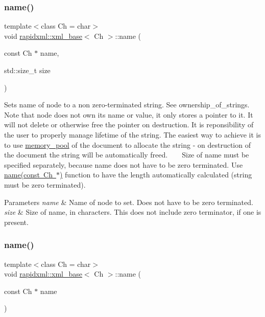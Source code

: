 \subsubsection{\texorpdfstring{name()}{name()}\hspace{0.1cm}{\footnotesize\ttfamily [2/3]}}
{\footnotesize\ttfamily template$<$class Ch  = char$>$ \\
void \mbox{\hyperlink{classrapidxml_1_1xml__base}{rapidxml\+::xml\+\_\+base}}$<$ Ch $>$\+::name (\begin{DoxyParamCaption}\item[{const Ch $\ast$}]{name,  }\item[{std\+::size\+\_\+t}]{size }\end{DoxyParamCaption})\hspace{0.3cm}{\ttfamily [inline]}}

Sets name of node to a non zero-\/terminated string. See ownership\+\_\+of\+\_\+strings. ~\newline
~\newline
 Note that node does not own its name or value, it only stores a pointer to it. It will not delete or otherwise free the pointer on destruction. It is reponsibility of the user to properly manage lifetime of the string. The easiest way to achieve it is to use \mbox{\hyperlink{classrapidxml_1_1memory__pool}{memory\+\_\+pool}} of the document to allocate the string -\/ on destruction of the document the string will be automatically freed. ~\newline
~\newline
 Size of name must be specified separately, because name does not have to be zero terminated. Use \mbox{\hyperlink{classrapidxml_1_1xml__base_a4611ddc82ac83a527c65606600eb2a0d}{name(const Ch $\ast$)}} function to have the length automatically calculated (string must be zero terminated). 
\begin{DoxyParams}{Parameters}
{\em name} & Name of node to set. Does not have to be zero terminated. \\
\hline
{\em size} & Size of name, in characters. This does not include zero terminator, if one is present. \\
\hline
\end{DoxyParams}
\mbox{\label{classrapidxml_1_1xml__base_a4611ddc82ac83a527c65606600eb2a0d}} 
\subsubsection{\texorpdfstring{name()}{name()}\hspace{0.1cm}{\footnotesize\ttfamily [3/3]}}
{\footnotesize\ttfamily template$<$class Ch  = char$>$ \\
void \mbox{\hyperlink{classrapidxml_1_1xml__base}{rapidxml\+::xml\+\_\+base}}$<$ Ch $>$\+::name (\begin{DoxyParamCaption}\item[{const Ch $\ast$}]{name }\end{DoxyParamCaption})\hspace{0.3cm}{\ttfamily [inline]}}

